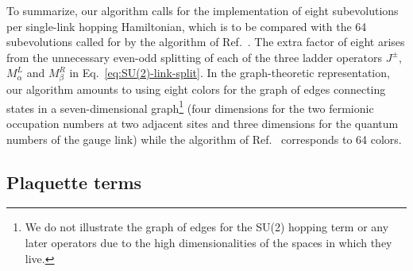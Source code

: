 \documentclass[aps,prd,twocolumn,showpacs,groupedaddress,superscriptaddress,nofootinbib,floatfix,preprintnumbers,longbibliography]{revtex4-1}
\begin{document}
To summarize, our algorithm calls for the implementation of eight subevolutions per single-link hopping Hamiltonian, which is to be compared with the 64 subevolutions called for by the algorithm of Ref.~\cite{Kan:2021xfc}. The extra factor of eight arises from the unnecessary even-odd splitting of each of the three ladder operators $J^{\pm}$, $M_{\alpha}^{L}$ and $M_{\beta}^{R}$ in Eq.~\eqref{eq:SU(2)-link-split}. In the graph-theoretic representation, our algorithm amounts to using eight colors for the graph of edges connecting states in a seven-dimensional graph\footnote{We do not illustrate the graph of edges for the SU(2) hopping term or any later operators due to the high dimensionalities of the spaces in which they live.} (four dimensions for the two fermionic occupation numbers at two adjacent sites and three dimensions for the quantum numbers of the gauge link) while the algorithm of Ref.~\cite{Kan:2021xfc} corresponds to 64 colors.

\subsection{\label{sec: su(2) plaq counting}Plaquette terms}
\end{document}
